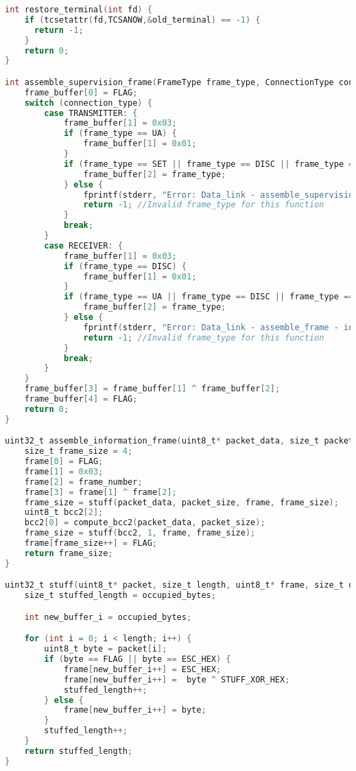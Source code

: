 \begin{lstlisting}[language=C, caption=data_link.c]
int restore_terminal(int fd) {
    if (tcsetattr(fd,TCSANOW,&old_terminal) == -1) {
      return -1;
    }
    return 0;
}

int assemble_supervision_frame(FrameType frame_type, ConnectionType connection_type, uint8_t* frame_buffer) {
    frame_buffer[0] = FLAG;
    switch (connection_type) {
        case TRANSMITTER: {
            frame_buffer[1] = 0x03;
            if (frame_type == UA) {
                frame_buffer[1] = 0x01;
            } 
            if (frame_type == SET || frame_type == DISC || frame_type == UA) {
                frame_buffer[2] = frame_type;
            } else {
                fprintf(stderr, "Error: Data_link - assemble_supervision_frame - invalyd frame_type: %x\n", frame_type);
                return -1; //Invalid frame_type for this function
            }
            break;
        }
        case RECEIVER: {
            frame_buffer[1] = 0x03;
            if (frame_type == DISC) {
                frame_buffer[1] = 0x01;
            } 
            if (frame_type == UA || frame_type == DISC || frame_type == RR_0 || frame_type == RR_1 || frame_type == REJ_0 || frame_type == REJ_1) {
                frame_buffer[2] = frame_type;
            } else {
                fprintf(stderr, "Error: Data_link - assemble_frame - invalyd frame_type\n");
                return -1; //Invalid frame_type for this function
            }
            break;
        }
    }
    frame_buffer[3] = frame_buffer[1] ^ frame_buffer[2];
    frame_buffer[4] = FLAG;
    return 0;
}

uint32_t assemble_information_frame(uint8_t* packet_data, size_t packet_size, uint8_t* frame, uint8_t frame_number) {
    size_t frame_size = 4;
    frame[0] = FLAG;
    frame[1] = 0x03;
    frame[2] = frame_number;
    frame[3] = frame[1] ^ frame[2];
    frame_size = stuff(packet_data, packet_size, frame, frame_size);
    uint8_t bcc2[2];
    bcc2[0] = compute_bcc2(packet_data, packet_size);
    frame_size = stuff(bcc2, 1, frame, frame_size);
    frame[frame_size++] = FLAG;
    return frame_size;
}

uint32_t stuff(uint8_t* packet, size_t length, uint8_t* frame, size_t occupied_bytes) {
    size_t stuffed_length = occupied_bytes;

    int new_buffer_i = occupied_bytes;

    for (int i = 0; i < length; i++) {
        uint8_t byte = packet[i];
        if (byte == FLAG || byte == ESC_HEX) {
            frame[new_buffer_i++] = ESC_HEX;
            frame[new_buffer_i++] =  byte ^ STUFF_XOR_HEX;
            stuffed_length++;
        } else {
            frame[new_buffer_i++] = byte;
        }
        stuffed_length++;
    }
    return stuffed_length;
}


\end{lstlisting}
